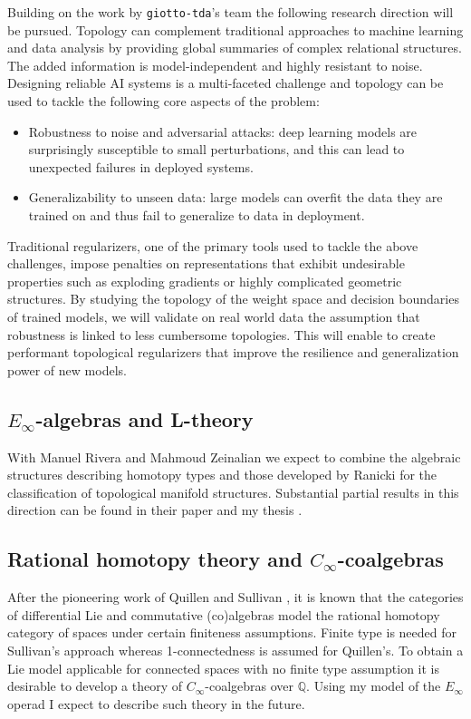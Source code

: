 Building on the work by \texttt{giotto-tda}'s team the following research direction will be pursued.
Topology can complement traditional approaches to machine learning and data analysis by providing global summaries of complex relational structures.
The added information is model-independent and highly resistant to noise.
Designing reliable AI systems is a multi-faceted challenge and topology can be used to tackle the following core aspects of the problem:
\begin{itemize}
	\item Robustness to noise and adversarial attacks: deep learning models are surprisingly susceptible to small perturbations, and this can lead to unexpected failures in deployed systems.
	\item Generalizability to unseen data: large models can overfit the data they are trained on and thus fail to generalize to data in deployment.
\end{itemize}
Traditional regularizers, one of the primary tools used to tackle the above challenges, impose penalties on representations that exhibit undesirable properties such as exploding gradients or highly complicated geometric structures.
By studying the topology of the weight space and decision boundaries of trained models, we will validate on real world data the assumption that robustness is linked to less cumbersome topologies.
This will enable to create performant topological regularizers that improve the resilience and generalization power of new models.

\subsection{$E_\infty$-algebras and L-theory}

With Manuel Rivera and Mahmoud Zeinalian we expect to combine the algebraic structures describing homotopy types \cite{sullivan1977infinitesimal, mandell2001padic} and those developed by Ranicki \cite{ranicki1992topological} for the classification of topological manifold structures.
Substantial partial results in this direction can be found in their paper \cite{rivera2018rigidification} and my thesis \cite{medina2015thesis}.

\subsection{Rational homotopy theory and $C_\infty$-coalgebras}

After the pioneering work of Quillen \cite{quillen1969rational} and Sullivan \cite{sullivan1977infinitesimal}, it is known that the categories of differential Lie and commutative (co)algebras model the rational homotopy category of spaces under certain finiteness assumptions.
Finite type is needed for Sullivan's approach whereas 1-connectedness is assumed for Quillen's.
To obtain a Lie model applicable for connected spaces with no finite type assumption it is desirable to develop a theory of $C_\infty$-coalgebras over $\mathbb{Q}$.
Using my model of the $E_\infty$ operad I expect to describe such theory in the future.

